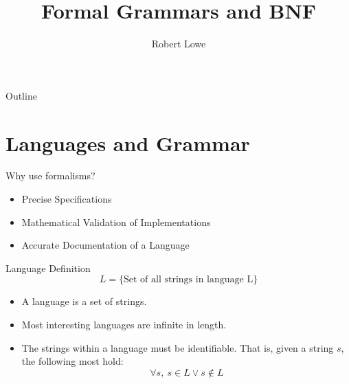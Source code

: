 \documentclass[]{beamer}
\title{Formal Grammars and BNF}
\author{Robert Lowe}
\institute[Southeast Missouri State University] %
{
  Department of Computer Science\\
  Southeast Missouri State University
}
\date[]{}
\begin{document}
\begin{frame}
  \titlepage
\end{frame}

\begin{frame}{Outline}
  \tableofcontents
\end{frame}





\section{Languages and Grammar}

\begin{frame}{Why use formalisms?}
    \begin{itemize}
        \item Precise Specifications
        \item Mathematical Validation of Implementations
        \item Accurate Documentation of a Language
    \end{itemize}
\end{frame}

\begin{frame}{Language Definition}
\[
L = \{\textrm{Set of all strings in language L}\}
\]

    \begin{itemize}
        \item A language is a set of strings.
        \item Most interesting languages are infinite in length.
        \item The strings within a language must be identifiable. That is, given a string
          $s$, the following most hold:
          \[
          \forall s,\  s \in L \vee s \notin L
          \]
    \end{itemize}
\end{frame}
\end{document}

